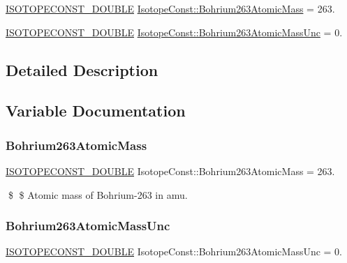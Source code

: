 \begin{DoxyCompactItemize}
\item 
\mbox{\hyperlink{group___isotope_const-_macros_ga8f45a7272ce02c0b4c65c44636ed719a}{I\+S\+O\+T\+O\+P\+E\+C\+O\+N\+S\+T\+\_\+\+D\+O\+U\+B\+LE}} \mbox{\hyperlink{group___isotope_const-_bohrium-_bh263_ga82be1938092b33e3237b48f73451e6a2}{Isotope\+Const\+::\+Bohrium263\+Atomic\+Mass}} = 263.
\item 
\mbox{\hyperlink{group___isotope_const-_macros_ga8f45a7272ce02c0b4c65c44636ed719a}{I\+S\+O\+T\+O\+P\+E\+C\+O\+N\+S\+T\+\_\+\+D\+O\+U\+B\+LE}} \mbox{\hyperlink{group___isotope_const-_bohrium-_bh263_ga03c7c4598ac58645c36020f767b418b7}{Isotope\+Const\+::\+Bohrium263\+Atomic\+Mass\+Unc}} = 0.
\end{DoxyCompactItemize}


\subsection{Detailed Description}


\subsection{Variable Documentation}
\mbox{\label{group___isotope_const-_bohrium-_bh263_ga82be1938092b33e3237b48f73451e6a2}} 
\subsubsection{\texorpdfstring{Bohrium263\+Atomic\+Mass}{Bohrium263AtomicMass}}
{\footnotesize\ttfamily \mbox{\hyperlink{group___isotope_const-_macros_ga8f45a7272ce02c0b4c65c44636ed719a}{I\+S\+O\+T\+O\+P\+E\+C\+O\+N\+S\+T\+\_\+\+D\+O\+U\+B\+LE}} Isotope\+Const\+::\+Bohrium263\+Atomic\+Mass = 263.}

\$ \$ Atomic mass of Bohrium-\/263 in amu. \mbox{\label{group___isotope_const-_bohrium-_bh263_ga03c7c4598ac58645c36020f767b418b7}} 
\subsubsection{\texorpdfstring{Bohrium263\+Atomic\+Mass\+Unc}{Bohrium263AtomicMassUnc}}
{\footnotesize\ttfamily \mbox{\hyperlink{group___isotope_const-_macros_ga8f45a7272ce02c0b4c65c44636ed719a}{I\+S\+O\+T\+O\+P\+E\+C\+O\+N\+S\+T\+\_\+\+D\+O\+U\+B\+LE}} Isotope\+Const\+::\+Bohrium263\+Atomic\+Mass\+Unc = 0.}


